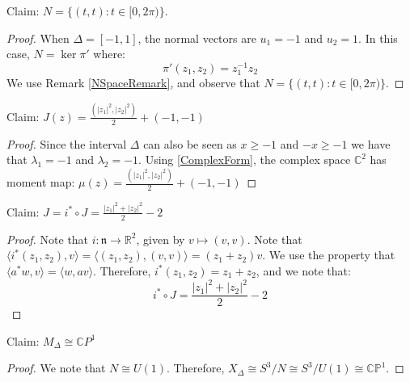 \begin{question}
Claim: $N = \{(t, t) : t \in [0, 2\pi)\}$.
\end{question}
\begin{proof}
When $\Delta = [-1,1]$, the normal vectors are $u_{1} = -1$ and $u_{2} = 1$. In this case, $N = \ker \pi'$ where:
\begin{equation}
\pi'(z_{1}, z_{2}) = z_{1}^{-1} z_{2}
\end{equation}
\noindent We use Remark \ref{NSpaceRemark}, and observe that $N = \{(t, t) : t \in [0, 2\pi)\}$.
\end{proof}
\begin{question}
Claim: $J(z) = \frac{(|z_{1}|^2, |z_{2}|^2)}{2} + (-1, -1) $
\end{question}
\begin{proof}
Since the interval $\Delta$ can also be seen as $x \geq -1$ and $-x \geq -1$ we have that $\lambda_{1} = -1$ and $\lambda_{2} = -1$.
Using \ref{ComplexForm}, the complex space $\mathbb{C}^{2}$ has moment map: $\mu(z) = \frac{(|z_{1}|^2, |z_{2}|^2)}{2} + (-1, -1)  $
\end{proof}
\begin{question}
Claim: $J = i^{*} \circ J = \frac{|z_{1}|^2 + |z_{2}|^2}{2} - 2$
\end{question}
\begin{proof}
Note that $i: \mathfrak{n} \to \mathbb{R}^2$, given by $v \mapsto (v,v)$. Note that $\langle i^{*}(z_{1}, z_{2}), v \rangle = \langle (z_{1}, z_{2}), (v, v) \rangle = (z_{1} + z_{2}) v$. We use the property that $\langle a^{*} w, v \rangle = \langle w, av \rangle$.
Therefore, $i^{*}(z_{1}, z_{2}) = z_{1} + z_{2}$, and we note that:
$$i^{*} \circ J = \frac{|z_{1}|^2 + |z_{2}|^2}{2} - 2$$
\end{proof}
\begin{question}
Claim: $M_{\Delta} \cong \mathbb{C} P^{1}$
\end{question}
\begin{proof}
We note that $N \cong U(1)$. Therefore, $X_{\Delta} \cong S^{3}/N \cong S^{3}/U(1) \cong \mathbb{CP}^{1}$. 
\end{proof}

